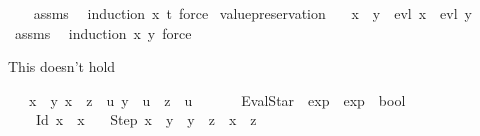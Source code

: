 \begin{isabellebody}
%
\isadelimproof
\ \ %
\endisadelimproof
%
\isatagproof
{}\isamarkupfalse%
\ assms\ \isamarkupfalse%
\ {\isacharparenleft}{\kern0pt}induction\ x\ t{\isacharsemicolon}{\kern0pt}\ force{\isacharparenright}{\kern0pt}%
\endisatagproof
{\isafoldproof}%
%
\isadelimproof
\isanewline
%
\endisadelimproof
\isanewline
{}\isamarkupfalse%
\ value{\isacharunderscore}{\kern0pt}preservation{\isacharcolon}{\kern0pt}\isanewline
\ \ \ {\isachardoublequoteopen}x\ {\isasymRrightarrow}\ y{\isachardoublequoteclose}\ \ {\isachardoublequoteopen}evl\ x\ {\isacharequal}{\kern0pt}\ evl\ y{\isachardoublequoteclose}\isanewline
%
\isadelimproof
\ \ %
\endisadelimproof
%
\isatagproof
{}\isamarkupfalse%
\ assms\ \isamarkupfalse%
\ {\isacharparenleft}{\kern0pt}induction\ x\ y{\isacharsemicolon}{\kern0pt}\ force{\isacharparenright}{\kern0pt}%
\endisatagproof
{\isafoldproof}%
%
\isadelimproof
%
\endisadelimproof
%
\begin{isamarkuptext}%
This doesn't hold%
\end{isamarkuptext}\isamarkuptrue%
\isamarkupfalse%
\isanewline
\ \ \ {\isachardoublequoteopen}x\ {\isasymRrightarrow}\ y{\isachardoublequoteclose}\ {\isachardoublequoteopen}x\ {\isasymRrightarrow}\ z{\isachardoublequoteclose}\ \ {\isachardoublequoteopen}{\isasymexists}u{\isachardot}{\kern0pt}\ y\ {\isasymRrightarrow}\ u\ {\isasymand}\ z\ {\isasymRrightarrow}\ u{\isachardoublequoteclose}\isanewline
\ \ \isamarkupfalse%
\isanewline
%
\isadelimproof
\ \ %
\endisadelimproof
%
\isatagproof
{}\isamarkupfalse%
%
\endisatagproof
{\isafoldproof}%
%
\isadelimproof
\isanewline
%
\endisadelimproof
\isanewline
{}\isamarkupfalse%
\ EvalStar\ {\isacharcolon}{\kern0pt}{\isacharcolon}{\kern0pt}\ {\isachardoublequoteopen}exp\ {\isasymRightarrow}\ exp\ {\isasymRightarrow}\ bool{\isachardoublequoteclose}\ {\isacharparenleft}{\kern0pt}\ {\isachardoublequoteopen}{\isasymRrightarrow}{\isacharasterisk}{\kern0pt}{\isachardoublequoteclose}\ {}{}{\isacharparenright}{\kern0pt}\ \isanewline
\ \ \ \ Id{\isacharcolon}{\kern0pt}\ {\isachardoublequoteopen}x\ {\isasymRrightarrow}{\isacharasterisk}{\kern0pt}\ x{\isachardoublequoteclose}\isanewline
\ \ {\isacharbar}{\kern0pt}\ Step{\isacharcolon}{\kern0pt}\ {\isachardoublequoteopen}x\ {\isasymRrightarrow}\ y\ {\isasymLongrightarrow}\ y\ {\isasymRrightarrow}{\isacharasterisk}{\kern0pt}\ z\ {\isasymLongrightarrow}\ x\ {\isasymRrightarrow}{\isacharasterisk}{\kern0pt}\ z{\isachardoublequoteclose}\isanewline

\end{isabellebody}
